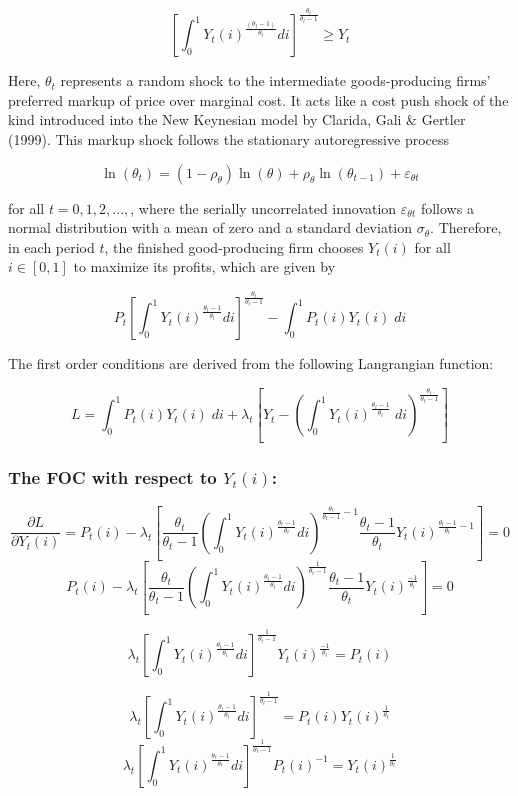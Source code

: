 \documentclass[11pt,preprint, authoryear]{elsarticle}
\numberwithin{equation}{section}
\numberwithin{figure}{section}
\numberwithin{table}{section}
\begin{document}
\[[\int_0^1Y_t(i)^{\frac{(\theta_t-1)}{\theta_t}} di]^{\frac{\theta_t}{\theta_t-1}} \ge Y_t\]

Here, \(\theta_t\) represents a random shock to the intermediate
goods-producing firms' preferred markup of price over marginal cost. It
acts like a cost push shock of the kind introduced into the New
Keynesian model by Clarida, Gali \& Gertler (1999). This markup shock
follows the stationary autoregressive process

\[\ln(\theta_t)=(1-\rho_{\theta})\ln(\theta)+\rho_{\theta}\ln(\theta_{t-1})+\varepsilon_{\theta t} \tag{10}\]

for all \(t=0,1,2,...,\), where the serially uncorrelated innovation
\(\varepsilon_{\theta t}\) follows a normal distribution with a mean of
zero and a standard deviation \(\sigma_{\theta}\). Therefore, in each
period \(t\), the finished good-producing firm chooses \(Y_t(i)\) for
all \(i \in [0,1]\) to maximize its profits, which are given by

\[P_t[\int_0^1Y_t(i)^{\frac{\theta_t-1}{\theta_t}} di]^{\frac{\theta_t}{\theta_t-1}} - \int_0^1P_t(i)Y_t(i) \;di\]

The first order conditions are derived from the following Langrangian
function:

\[L = \int_0^1P_t(i)Y_t(i) \; di +\lambda_t[Y_t - (\int_0^1Y_t(i)^{\frac{\theta_t-1}{\theta_t}} \;di)^{\frac{\theta_t}{\theta_t-1}}]\]

\hypertarget{the-foc-with-respect-to-y_ti}{%
\subsubsection{\texorpdfstring{The FOC with respect to
\(Y_t(i)\):}{The FOC with respect to Y\_t(i):}}\label{the-foc-with-respect-to-y_ti}}

\[\frac{\partial L}{\partial Y_t(i)} = P_t(i) - \lambda_t[{\frac{\theta_t}{\theta_t-1}} (\int_0^1 Y_t(i)^{\frac{\theta_t-1}{\theta_t}} di)^{\frac{\theta_t}{\theta_t-1} -1} \frac{\theta_t-1}{\theta_t} Y_t(i)^{\frac{\theta_t-1}{\theta_t} -1}] = 0\]
\[P_t(i) - \lambda_t[{\frac{\theta_t}{\theta_t-1}} (\int_0^1 Y_t(i)^{\frac{\theta_t-1}{\theta_t}} di)^{\frac{1}{\theta_t-1}} \frac{\theta_t-1}{\theta_t} Y_t(i)^{\frac{-1}{\theta_t}}] = 0\]

\[ \lambda_t[\int_0^1 Y_t(i)^{\frac{\theta_t-1}{\theta_t}} di]^{\frac{1}{\theta_t-1}} Y_t(i)^{\frac{-1}{\theta_t}} = P_t(i)\]

\[ \lambda_t[\int_0^1 Y_t(i)^{\frac{\theta_t-1}{\theta_t}} di]^{\frac{1}{\theta_t-1}}  = P_t(i)Y_t(i)^{\frac{1}{\theta_t}}\]
\[ \lambda_t[\int_0^1 Y_t(i)^{\frac{\theta_t-1}{\theta_t}} di]^{\frac{1}{\theta_t-1}}P_t(i)^{-1}  = Y_t(i)^{\frac{1}{\theta_t}}\]
\end{document}
